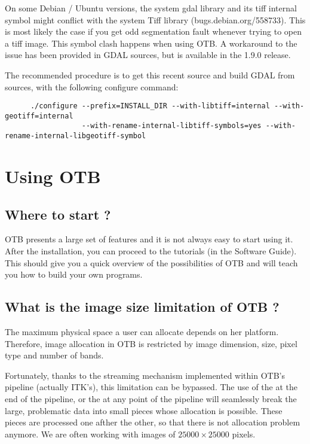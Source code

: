 On some Debian / Ubuntu versions, the system gdal library and its tiff internal symbol might conflict with the system Tiff library (bugs.debian.org/558733). This is most likely the case if you get odd segmentation fault whenever trying to open a tiff image. This symbol clash happens when using OTB. A workaround to the issue has been provided in GDAL sources, but is available in the 1.9.0 release.

The recommended procedure is to get this recent source and build GDAL from sources, with the following configure command: 
  \begin{verbatim}
      ./configure --prefix=INSTALL_DIR --with-libtiff=internal --with-geotiff=internal 
                  --with-rename-internal-libtiff-symbols=yes --with-rename-internal-libgeotiff-symbol 
  \end{verbatim}


\section{Using OTB}

\subsection{Where to start ?}

OTB presents a large set of features and it is not always easy to start using it.
After the installation, you can proceed to the tutorials (in the Software Guide).
This should give you a quick overview of the possibilities of OTB and will teach
you how to build your own programs.

\subsection{What is the image size limitation of OTB ?}

The maximum physical space a user can allocate depends on her platform. Therefore,
image allocation in OTB is restricted by image dimension, size, pixel type and number
of bands.

Fortunately, thanks to the streaming mechanism implemented within
OTB's pipeline (actually ITK's), this limitation can be bypassed. The
use of the  at the end of the pipeline,
or the  at any point of the pipeline will
seamlessly break the large, problematic data into small pieces whose
allocation is possible. These pieces are processed one afther the
other, so that there is not allocation problem anymore. We are often working with
images of $25000 \times 25000$ pixels.

